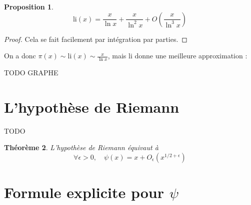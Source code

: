 \documentclass[french]{report}
\newtheorem{theorem}{Théorème}[section]
\newtheorem{proposition}[theorem]{Proposition}
\begin{document}
\begin{proposition}
  \[ \mathrm{li}(x) = \frac{x}{\ln x} + \frac{x}{\ln^2 x} + O\left(\frac{x}{\ln^3 x} \right) \]
\end{proposition}

\begin{proof}
  Cela se fait facilement par intégration par parties.
\end{proof}

On a donc $\pi(x)\sim\mathrm{li}(x)\sim\frac{x}{\ln x}$, mais $\mathrm{li}$ donne une meilleure approximation :

TODO GRAPHE

\section{L'hypothèse de Riemann}

TODO

\begin{theorem}
  L'hypothèse de Riemann équivaut à
  \[ \forall\epsilon>0,\quad\psi(x)=x+O_\epsilon(x^{1/2+\epsilon}) \]
\end{theorem}

\section{Formule explicite pour $\psi$}



% 
\end{document}

